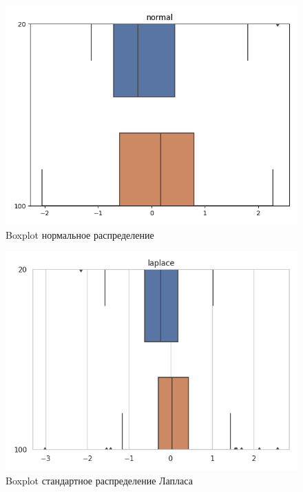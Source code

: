 \documentclass[12pt]{article}
\begin{document}
\begin{center}
\begin{figure}[H]
\caption{Boxplot нормальное распределение }
\includegraphics[scale = 0.7]{normal.png}
\end{figure}

\begin{figure}[H]
\caption{Boxplot стандартное распределение Лапласа }
\includegraphics[scale = 0.7]{laplace.png} 
\end{figure}


\end{center}
\end{document}
